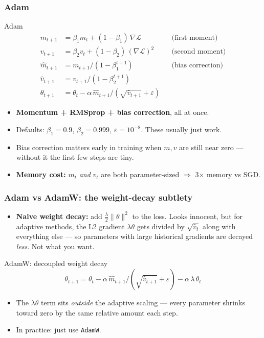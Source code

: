 \begin{frame}
\frametitle{Adam}
\begin{block}{Adam}
\vspace{-0.3cm}
\begin{align*}
    m_{t+1} &= \beta_1 m_t + (1-\beta_1)\, \nabla \mathcal{L}      &&\text{(first moment)} \\
    v_{t+1} &= \beta_2 v_t + (1-\beta_2)\, (\nabla \mathcal{L})^2  &&\text{(second moment)} \\
    \hat{m}_{t+1} &= m_{t+1} / (1 - \beta_1^{t+1})                 &&\text{(bias correction)} \\
    \hat{v}_{t+1} &= v_{t+1} / (1 - \beta_2^{t+1})                 \\
    \theta_{t+1} &= \theta_t - \alpha\, \hat{m}_{t+1} / (\sqrt{\hat{v}_{t+1}} + \varepsilon)
\end{align*}
\end{block}
\begin{itemize}
    \pause
    \item \textbf{Momentum + RMSprop + bias correction}, all at once.
    \pause
    \item Defaults: $\beta_1 = 0.9$, $\beta_2 = 0.999$, $\varepsilon = 10^{-8}$.
    These usually just work.
    \pause
    \item Bias correction matters early in training when $m, v$ are still
    near zero --- without it the first few steps are tiny.
    \pause
    \item \textbf{Memory cost:} $m_t$ \emph{and} $v_t$ are both parameter-sized
    $\Rightarrow$ 3$\times$ memory vs SGD.
\end{itemize}
\end{frame}

\begin{frame}
\frametitle{Adam vs AdamW: the weight-decay subtlety}
\begin{itemize}
    \item \textbf{Naive weight decay:} add $\tfrac{\lambda}{2}\|\theta\|^2$ to
    the loss. Looks innocent, but for adaptive methods, the L2 gradient
    $\lambda \theta$ gets divided by $\sqrt{\hat{v}_t}$ along with everything
    else --- so parameters with large historical gradients are decayed
    \emph{less}. Not what you want.
    \pause
\end{itemize}
\begin{block}{AdamW: decoupled weight decay}
    $$ \theta_{t+1} = \theta_t - \alpha\, \hat{m}_{t+1}/(\sqrt{\hat{v}_{t+1}}+\varepsilon) - \alpha\, \lambda\, \theta_t $$
\end{block}
\begin{itemize}
    \pause
    \item The $\lambda \theta$ term sits \textit{outside} the adaptive scaling
    --- every parameter shrinks toward zero by the same relative amount each
    step.
    \pause
    \item In practice: just use \texttt{AdamW}.
\end{itemize}
\end{frame}

